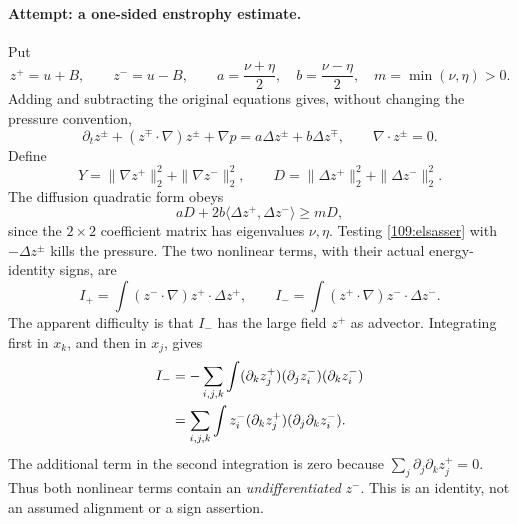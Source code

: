 \documentclass[11pt,a4paper]{article}
\numberwithin{equation}{section}
\begin{document}
\paragraph{Attempt: a one-sided enstrophy estimate.}
Put
\[
 z^+=u+B,\qquad z^-=u-B,\qquad
 a=\frac{\nu+\eta}{2},\quad b=\frac{\nu-\eta}{2},\quad
 m=\min(\nu,\eta)>0.
\]
Adding and subtracting the original equations gives, without changing the
pressure convention,
\begin{equation}\label{109:elsasser}
 \partial_tz^\pm+(z^\mp\cdot\nabla)z^\pm+\nabla p
 =a\Delta z^\pm+b\Delta z^\mp,
 \qquad \nabla\cdot z^\pm=0.
\end{equation}
Define
\[
 Y=\|\nabla z^+\|_2^2+\|\nabla z^-\|_2^2,\qquad
 D=\|\Delta z^+\|_2^2+\|\Delta z^-\|_2^2.
\]
The diffusion quadratic form obeys
\begin{equation}\label{109:diffusion}
 aD+2b\langle\Delta z^+,\Delta z^-\rangle\geq mD,
\end{equation}
since the $2\times2$ coefficient matrix has eigenvalues $\nu,\eta$.
Testing \eqref{109:elsasser} with $-\Delta z^\pm$ kills the pressure.
The two nonlinear terms, with their actual energy-identity signs, are
\[
 I_+=\int (z^-\cdot\nabla)z^+\cdot\Delta z^+,
 \qquad I_-=\int (z^+\cdot\nabla)z^-\cdot\Delta z^-.
\]
The apparent difficulty is that $I_-$ has the large field $z^+$ as
advector. Integrating first in $x_k$, and then in $x_j$, gives
\begin{align}
 I_-&=-\sum_{i,j,k}\int
       (\partial_k z^+_j)(\partial_j z^-_i)(\partial_k z^-_i)
       \notag\\
 &=\sum_{i,j,k}\int z^-_i(\partial_k z^+_j)
                         (\partial_j\partial_k z^-_i).
 \label{109:cancellation}
\end{align}
The additional term in the second integration is zero because
$\sum_j\partial_j\partial_k z^+_j=0$. Thus both nonlinear terms contain
an \emph{undifferentiated} $z^-$. This is an identity, not an assumed
alignment or a sign assertion.
\end{document}
